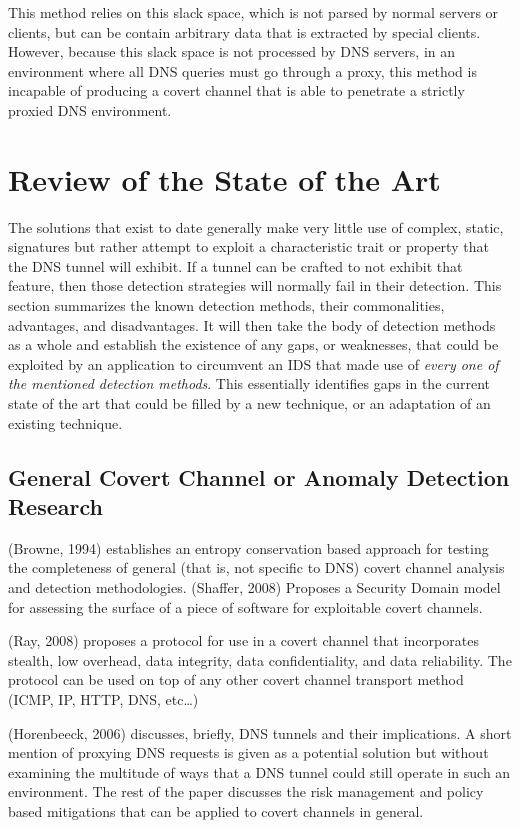 \documentclass[12pt]{report}
\theoremstyle{remark}
\theoremstyle{definition}
\theoremstyle{definition}
\theoremstyle{definition}
\begin{document}
This method relies on this slack space, which is not parsed by normal servers
or clients, but can be contain arbitrary data that is extracted by special
clients. However, because this slack space is not processed by DNS servers, in
an environment where all DNS queries must go through a proxy, this method is
incapable of producing a covert channel that is able to penetrate a strictly
proxied DNS environment.

\newpage
\chapter{Review of the State of the Art}
\label{litreview}

The solutions that exist to date generally make very little use of complex,
static, signatures but rather attempt to exploit a characteristic trait or
property that the DNS tunnel will exhibit. If a tunnel can be crafted to not
exhibit that feature, then those detection strategies will normally fail in
their detection. This section summarizes the known detection methods, their
commonalities, advantages, and disadvantages. It will then take the body of
detection methods as a whole and establish the existence of any gaps, or
weaknesses, that could be exploited by an application to circumvent an IDS that
made use of \emph{every one of the mentioned detection methods}. This
essentially identifies gaps in the current state of the art that could be filled
by a new technique, or an adaptation of an existing technique.

\section{General Covert Channel or Anomaly Detection Research}
(Browne, 1994)\cite{Browne1994} establishes an entropy conservation based
approach for testing the completeness of general (that is, not specific to DNS)
covert channel analysis and detection methodologies. (Shaffer,
2008)\cite{Shaffer2008} Proposes a Security Domain model for assessing the
surface of a piece of software for exploitable covert channels.

(Ray, 2008)\cite{Ray2008} proposes a protocol for use in a covert channel that
incorporates stealth, low overhead, data integrity, data confidentiality, and
data reliability. The protocol can be used on top of any other covert channel
transport method (ICMP, IP, HTTP, DNS, etc\ldots)

(Horenbeeck, 2006)\cite{Horenbeeck2006} discusses, briefly, DNS tunnels and
their implications. A short mention of proxying DNS requests is given as a
potential solution but without examining the multitude of ways that a DNS tunnel
could still operate in such an environment. The rest of the paper discusses the
risk management and policy based mitigations that can be applied to covert
channels in general.
\end{document}

